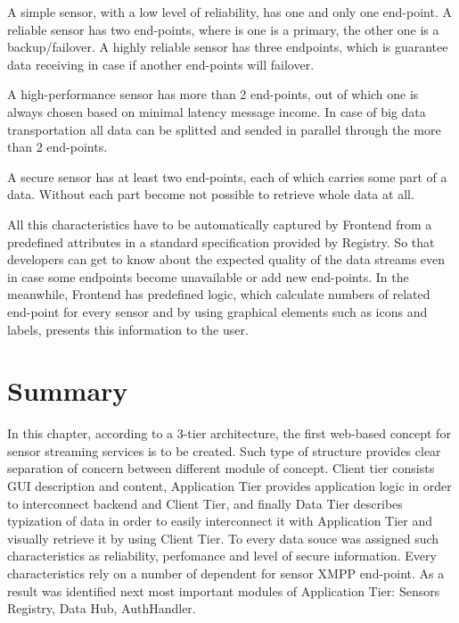   A simple sensor, with a low level of reliability, has one and only one end-point. A reliable sensor has two end-points, where is one is a primary, the other one is a backup/failover. A highly reliable sensor has three endpoints, which is guarantee data receiving in case if another end-points will failover. 

  A high-performance sensor has more than 2 end-points, out of which one is always chosen based on minimal latency message income. In case of big data transportation all data can be splitted and sended in parallel through the more than 2 end-points. 

  A secure sensor has at least two end-points, each of which carries some part of a data. Without each part become not possible to retrieve whole data at all. 

 All this characteristics have to be automatically captured by Frontend from a predefined attributes in a standard specification provided by Registry. So that developers can get to know about the expected quality of the data streams even in case some endpoints become unavailable or add new end-points. In the meanwhile, Frontend has predefined logic, which calculate numbers of related end-point for every sensor and by using graphical elements such as icons and labels, presents this information to the user.

\section{Summary}
	In this chapter, according to a 3-tier architecture, the first web-based concept for sensor streaming services is to be created. Such type of structure provides clear separation of concern between different module of concept. Client tier consists GUI description and content, Application Tier provides application logic in order to interconnect backend and Client Tier, and finally Data Tier describes typization of data in order to easily interconnect it with Application Tier and visually retrieve it by using Client Tier. To every data souce was assigned such characteristics as reliability, perfomance and level of secure information. Every characteristics rely on a number of dependent for sensor XMPP end-point.
  As a result was identified next most important modules of Application Tier: Sensors Registry, Data Hub, AuthHandler. 

